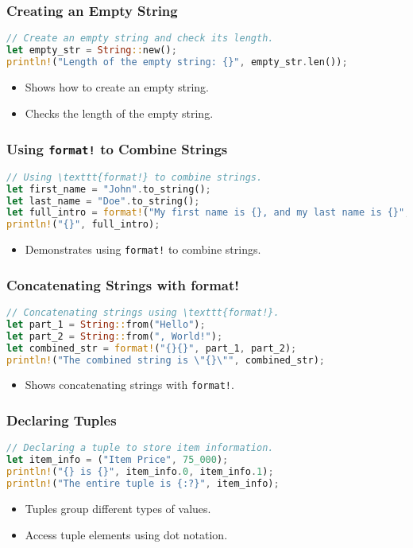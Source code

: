 \documentclass[aspectratio=169, table]{beamer}
\begin{document}
\begin{frame}[fragile]
\frametitle{Creating an Empty String}
\begin{lstlisting}[language=Rust]
// Create an empty string and check its length.
let empty_str = String::new();
println!("Length of the empty string: {}", empty_str.len());
\end{lstlisting}
\begin{itemize}
\item Shows how to create an empty string.
\item Checks the length of the empty string.
\end{itemize}
\end{frame}

\begin{frame}[fragile]
\frametitle{Using \texttt{format!} to Combine Strings}
\begin{lstlisting}[language=Rust]
// Using \texttt{format!} to combine strings.
let first_name = "John".to_string();
let last_name = "Doe".to_string();
let full_intro = format!("My first name is {}, and my last name is {}", first_name, last_name);
println!("{}", full_intro);
\end{lstlisting}
\begin{itemize}
\item Demonstrates using \texttt{format!} to combine strings.
\end{itemize}
\end{frame}

\begin{frame}[fragile]
\frametitle{Concatenating Strings with format!}
\begin{lstlisting}[language=Rust]
// Concatenating strings using \texttt{format!}.
let part_1 = String::from("Hello");
let part_2 = String::from(", World!");
let combined_str = format!("{}{}", part_1, part_2);
println!("The combined string is \"{}\"", combined_str);
\end{lstlisting}
\begin{itemize}
\item Shows concatenating strings with \texttt{format!}.
\end{itemize}
\end{frame}

\begin{frame}[fragile]
\frametitle{Declaring Tuples}
\begin{lstlisting}[language=Rust]
// Declaring a tuple to store item information.
let item_info = ("Item Price", 75_000);
println!("{} is {}", item_info.0, item_info.1);
println!("The entire tuple is {:?}", item_info);
\end{lstlisting}
\begin{itemize}
\item Tuples group different types of values.
\item Access tuple elements using dot notation.
\end{itemize}
\end{frame}
\end{document}
